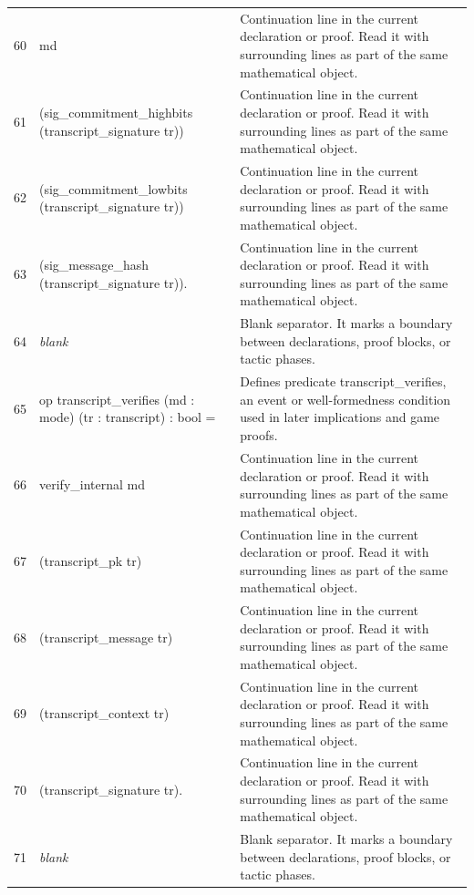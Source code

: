 \documentclass[10pt]{article}
\begin{document}
\begin{longtable}{r L{0.53\textwidth} L{0.37\textwidth}}
60 & {\ttfamily\scriptsize     md} & Continuation line in the current declaration or proof.  Read it with surrounding lines as part of the same mathematical object. \\
61 & {\ttfamily\scriptsize     (sig\_commitment\_highbits (transcript\_signature tr))} & Continuation line in the current declaration or proof.  Read it with surrounding lines as part of the same mathematical object. \\
62 & {\ttfamily\scriptsize     (sig\_commitment\_lowbits (transcript\_signature tr))} & Continuation line in the current declaration or proof.  Read it with surrounding lines as part of the same mathematical object. \\
63 & {\ttfamily\scriptsize     (sig\_message\_hash (transcript\_signature tr)).} & Continuation line in the current declaration or proof.  Read it with surrounding lines as part of the same mathematical object. \\
64 & {\ttfamily\scriptsize \emph{blank}} & Blank separator.  It marks a boundary between declarations, proof blocks, or tactic phases. \\
65 & {\ttfamily\scriptsize op transcript\_verifies (md : mode) (tr : transcript) : bool =} & Defines predicate transcript\_verifies, an event or well-formedness condition used in later implications and game proofs. \\
66 & {\ttfamily\scriptsize   verify\_internal md} & Continuation line in the current declaration or proof.  Read it with surrounding lines as part of the same mathematical object. \\
67 & {\ttfamily\scriptsize     (transcript\_pk tr)} & Continuation line in the current declaration or proof.  Read it with surrounding lines as part of the same mathematical object. \\
68 & {\ttfamily\scriptsize     (transcript\_message tr)} & Continuation line in the current declaration or proof.  Read it with surrounding lines as part of the same mathematical object. \\
69 & {\ttfamily\scriptsize     (transcript\_context tr)} & Continuation line in the current declaration or proof.  Read it with surrounding lines as part of the same mathematical object. \\
70 & {\ttfamily\scriptsize     (transcript\_signature tr).} & Continuation line in the current declaration or proof.  Read it with surrounding lines as part of the same mathematical object. \\
71 & {\ttfamily\scriptsize \emph{blank}} & Blank separator.  It marks a boundary between declarations, proof blocks, or tactic phases. \\

\end{longtable}
\end{document}
